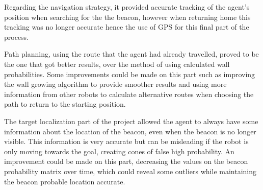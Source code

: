 \documentclass[oribibl]{llncs}
\begin{document}
Regarding the navigation strategy, it provided accurate tracking of the agent's position
when searching for the the beacon, however when returning home this tracking was no longer
accurate hence the use of GPS for this final part of the process.

Path planning, using the route that the agent had already travelled, proved to be the one
that got better results, over the method of using calculated wall probabilities.
Some improvements could be made on this part such as improving the wall growing algorithm to
provide smoother results and using more information from other robots to calculate alternative
routes when choosing the path to return to the starting position.

The target localization part of the project allowed the agent to always have some information
about the location of the beacon, even when the beacon is no longer visible. This information
is very accurate but can be misleading if the robot is only moving towards the goal, creating
cones of false high probability. An improvement could be made on this part, decreasing the
values on the beacon probability matrix over time, which could reveal some outliers while maintaining the beacon probable location accurate.



\end{document}
